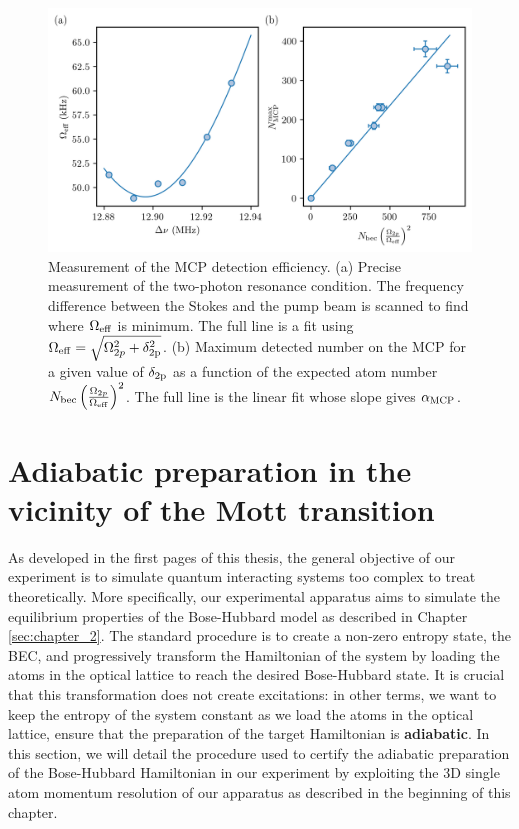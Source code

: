 \begin{figure}
    \centering
    \includegraphics[width=\textwidth]{Fig/Chapter3/eff_MCP.png}
    \caption[Measurement of the MCP detection efficiency]{Measurement of the MCP detection efficiency. (a) Precise measurement of the two-photon resonance condition. The frequency difference between the Stokes and the pump beam is scanned to find where $\Omega_{\rm{eff}}$ is minimum. The full line is a fit using $\Omega_{\rm{eff}}= \sqrt{\Omega_{2p}^2 + \delta_{\rm{2p}}^2}$. (b) Maximum detected number on the MCP for a given value of $\delta_{\rm{2p}}$ as a function of the expected atom number $N_{\rm{bec}} \left(\frac{\Omega_{2 p}}{\Omega_{\rm{eff}}}\right)^{2}$. The full line is the linear fit whose slope gives $\alpha_{\rm{MCP}}$.}
    \label{fig:eff_MCP}
\end{figure}

\section{Adiabatic preparation in the vicinity of the Mott transition}

\label{sec:adiabatic_prep}

As developed in the first pages of this thesis, the general objective of our experiment is to simulate quantum interacting systems too complex to treat theoretically. More specifically, our experimental apparatus aims to simulate the equilibrium properties of the Bose-Hubbard model as described in Chapter \ref{sec:chapter_2}. The standard procedure is to create a non-zero entropy state, the BEC, and progressively transform the Hamiltonian of the system by loading the atoms in the optical lattice to reach the desired Bose-Hubbard state. It is crucial that this transformation does not create excitations: in other terms, we want to keep the entropy of the system constant as we load the atoms in the optical lattice, \ie ensure that the preparation of the target Hamiltonian is \textbf{adiabatic}. In this section, we will detail the procedure used to certify the adiabatic preparation of the Bose-Hubbard Hamiltonian in our experiment by exploiting the 3D single atom momentum resolution of our apparatus as described in the beginning of this chapter. 


